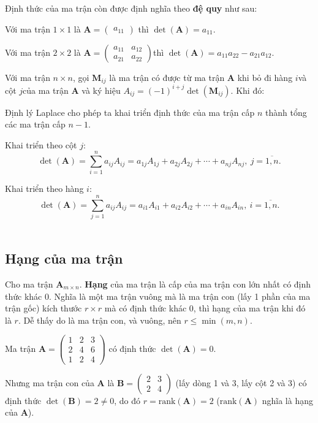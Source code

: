 \documentclass{mynotes}
\begin{document}
Định thức của ma trận còn được định nghĩa theo \textbf{đệ quy} như sau:

Với ma trận $1 \times 1$ là $\bm{A}=\begin{pmatrix}a_{11}\end{pmatrix}$ thì $\det(\bm{A})=a_{11}$.

Với ma trận $2 \times 2$ là $\bm{A} = \begin{pmatrix}a_{11} & a_{12} \\ a_{21} & a_{22}\end{pmatrix}$​ thì $\det(\bm{A})=a_{11}a_{22} - a_{21}a_{12}$.

Với ma trận $n \times n$, gọi $\bm{M}_{ij}$ là ma trận có được từ ma trận $\bm{A}$ khi bỏ đi hàng $i$​ và cột $j$​ của ma trận $\bm{A}$ và ký hiệu $A_{ij}=(-1)^{i+j} \det (\bm{M}_{ij})$. Khi đó:

\begin{theorem}
    Định lý Laplace cho phép ta khai triển định thức của ma trận cấp $n$ thành tổng các ma trận cấp $n-1$.

    Khai triển theo cột $j$​: \[ \det(\bm{A})=\displaystyle{\sum_{i=1}^na_{ij} A_{ij}} = a_{1j} A_{1j} + a_{2j} A_{2j} + \cdots + a_{nj} A_{nj},\ j = \overline{1, n}.\]

    Khai triển theo hàng $i$​: \[ \det(\bm{A})=\displaystyle{\sum_{j=1}^n a_{ij} A_{ij}} = a_{i1} A_{i1} + a_{i2} A_{i2} + \cdots + a_{in} A_{in},\ i = \overline{1, n}. \]​
\end{theorem}

\subsection*{Hạng của ma trận}

\begin{definition}
    Cho ma trận $\mathbf{A}_{m \times n}$. \textbf{Hạng} của ma trận là cấp của ma trận con lớn nhất có định thức khác 0. Nghĩa là một ma trận vuông mà là ma trận con (lấy 1 phần của ma trận gốc) kích thước $r \times r$ mà có định thức khác 0, thì hạng của ma trận khi đó là $r$. Dễ thấy do là ma trận con, và vuông, nên $r \leqslant \min(m, n)$.
\end{definition}

\begin{example}
    Ma trận $\bm{A} = \begin{pmatrix}
        1 & 2 & 3 \\ 2 & 4 & 6 \\ 1 & 2 & 4
    \end{pmatrix}$ có định thức $\det(\bm{A}) = 0$. 
    
    Nhưng ma trận con của $\bm{A}$ là $\bm{B} = \begin{pmatrix}2 & 3 \\ 2 & 4\end{pmatrix}$ (lấy dòng 1 và 3, lấy cột 2 và 3) có định thức $\det(\bm{B}) = 2 \neq 0$, do đó $r = \text{rank}(\bm{A}) = 2$ ($\text{rank}(\bm{A})$ nghĩa là hạng của $\bm{A}$).
\end{example}
\end{document}
